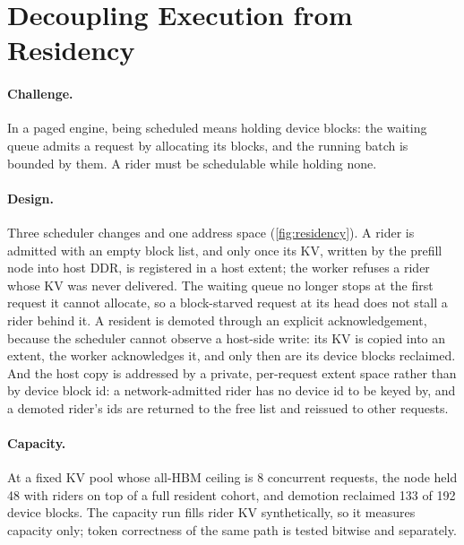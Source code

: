 
\section{Decoupling Execution from Residency}\label{sec:residency}



\paragraph{Challenge.} In a paged engine, being scheduled means holding device
blocks: the waiting queue admits a request by allocating its blocks, and the
running batch is bounded by them. A rider must be schedulable while holding none.

\paragraph{Design.} Three scheduler changes and one address space
(\cref{fig:residency}). A rider is admitted with an empty block list, and only
once its KV, written by the prefill node into host DDR, is registered in a host
extent; the worker refuses a rider whose KV was never delivered. The waiting
queue no longer stops at the first request it cannot allocate, so a
block-starved request at its head does not stall a rider behind it. A resident
is demoted through an explicit acknowledgement, because the scheduler cannot
observe a host-side write: its KV is copied into an extent, the worker
acknowledges it, and only then are its device blocks reclaimed. And the host
copy is addressed by a private, per-request extent space rather than by device
block id: a network-admitted rider has no device id to be keyed by, and a
demoted rider's ids are returned to the free list and reissued to other
requests.

\paragraph{Capacity.} At a fixed KV pool whose all-HBM ceiling is 8 concurrent
requests, the node held 48 with riders on top of a full resident cohort, and
demotion reclaimed 133 of 192 device blocks. The capacity run fills rider KV
synthetically, so it measures capacity only; token correctness of the same path
is tested bitwise and separately.
